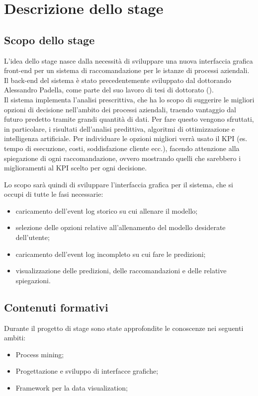 
\chapter{Descrizione dello stage}
\section{Scopo dello stage}
L'idea dello stage nasce dalla necessità di sviluppare una nuova interfaccia grafica front-end per un sistema di raccomandazione per le istanze di processi aziendali.
\\
Il back-end del sistema è stato precedentemente sviluppato dal dottorando Alessandro Padella, come parte del suo lavoro di tesi di dottorato (\cite{paper-padella}). 
\\
Il sistema implementa l'analisi prescrittiva, che ha lo scopo di suggerire le migliori opzioni di decisione nell'ambito dei processi aziendali, traendo vantaggio dal futuro predetto tramite grandi quantità di dati. Per fare questo vengono sfruttati, in particolare, i risultati dell'analisi predittiva, algoritmi di ottimizzazione e intelligenza artificiale. Per individuare le opzioni migliori verrà usato il \gls{KPI} (es. tempo di esecuzione, costi, soddisfazione cliente ecc.), facendo attenzione alla spiegazione di ogni raccomandazione, ovvero mostrando quelli che sarebbero i miglioramenti al \gls{KPI} scelto per ogni decisione.

Lo scopo sarà quindi di sviluppare l'interfaccia grafica per il sistema, che si occupi di tutte le fasi necessarie: 
\begin{itemize}
\item caricamento dell'event log storico su cui allenare il modello;
\item selezione delle opzioni relative all'allenamento del modello desiderate dell'utente;
\item caricamento dell'event log incompleto su cui fare le predizioni;
\item visualizzazione delle predizioni, delle raccomandazioni e delle relative spiegazioni.
\end{itemize}

\section{Contenuti formativi}
Durante il progetto di stage sono state approfondite le conoscenze nei seguenti ambiti:
\begin{itemize}
\item Process mining; 
\item Progettazione e sviluppo di interfacce grafiche;
\item Framework per la data visualization;
\end{itemize}

